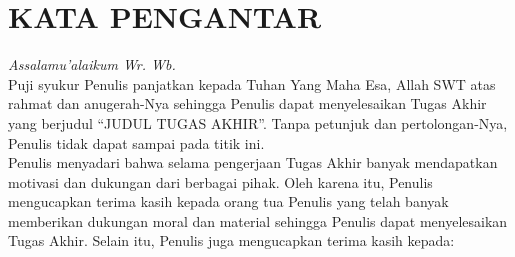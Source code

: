 \chapter{KATA PENGANTAR}
\vspace{1.0cm}

\textit{Assalamu’alaikum Wr. Wb.} \\

	Puji syukur Penulis panjatkan kepada Tuhan Yang Maha Esa, Allah SWT atas rahmat dan anugerah-Nya sehingga Penulis dapat menyelesaikan Tugas Akhir yang berjudul “JUDUL TUGAS AKHIR”. Tanpa petunjuk dan pertolongan-Nya, Penulis tidak dapat sampai pada titik ini.  \\
	
	Penulis menyadari bahwa selama pengerjaan Tugas Akhir banyak mendapatkan motivasi dan dukungan dari berbagai pihak. Oleh karena itu, Penulis mengucapkan terima kasih kepada orang tua Penulis yang telah banyak memberikan dukungan moral dan material sehingga Penulis dapat menyelesaikan Tugas Akhir. Selain itu, Penulis juga mengucapkan terima kasih kepada:

